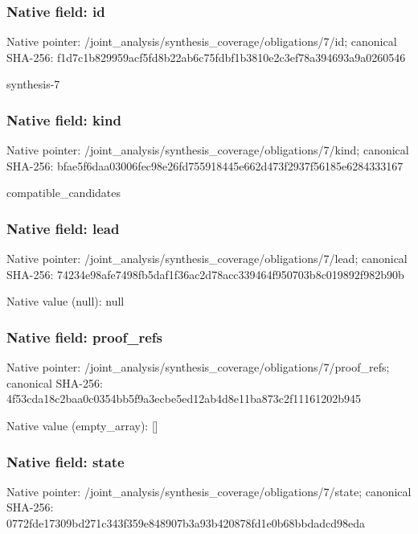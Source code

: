 \documentclass[10pt,a4paper]{article}
\begin{document}
\subsubsection{Native field: id}
Native pointer: /joint\_\allowbreak{}analysis/synthesis\_\allowbreak{}coverage/obligations/7/id; canonical SHA-256: f1d7c1b829959acf5fd8b22ab6c75fdbf1b3810e2c3ef78a394693a9a0260546

\begingroup\raggedright\sloppy synthesis-7\par\endgroup

\subsubsection{Native field: kind}
Native pointer: /joint\_\allowbreak{}analysis/synthesis\_\allowbreak{}coverage/obligations/7/kind; canonical SHA-256: bfae5f6daa03006fec98e26fd755918445e662d473f2937f56185e6284333167

\begingroup\raggedright\sloppy compatible\_\allowbreak{}candidates\par\endgroup

\subsubsection{Native field: lead}
Native pointer: /joint\_\allowbreak{}analysis/synthesis\_\allowbreak{}coverage/obligations/7/lead; canonical SHA-256: 74234e98afe7498fb5daf1f36ac2d78acc339464f950703b8c019892f982b90b

Native value (null): null

\subsubsection{Native field: proof\_\allowbreak{}refs}
Native pointer: /joint\_\allowbreak{}analysis/synthesis\_\allowbreak{}coverage/obligations/7/proof\_\allowbreak{}refs; canonical SHA-256: 4f53cda18c2baa0c0354bb5f9a3ecbe5ed12ab4d8e11ba873c2f11161202b945

Native value (empty\_\allowbreak{}array): []

\subsubsection{Native field: state}
Native pointer: /joint\_\allowbreak{}analysis/synthesis\_\allowbreak{}coverage/obligations/7/state; canonical SHA-256: 0772fde17309bd271c343f359e848907b3a93b420878fd1e0b68bbdadcd98eda
\end{document}
